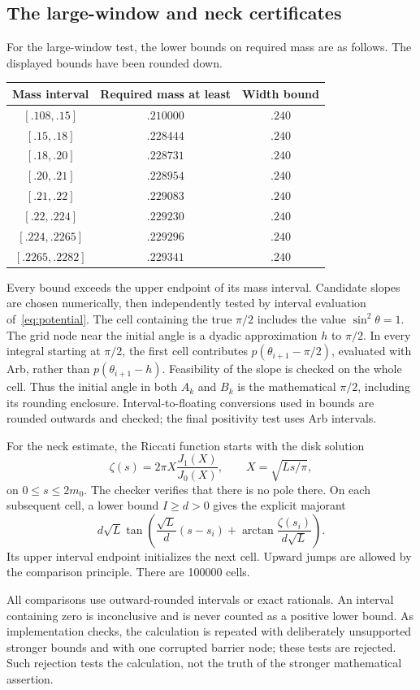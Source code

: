\subsection{The large-window and neck certificates}
For the large-window test, the lower bounds on required mass are as follows. The displayed bounds have been rounded down.
\begin{center}
\begin{tabular}{ccc}\toprule
Mass interval & Required mass at least & Width bound\\\midrule
$[.108,.15]$ & $.210000$ & $.240$\\
$[.15,.18]$ & $.228444$ & $.240$\\
$[.18,.20]$ & $.228731$ & $.240$\\
$[.20,.21]$ & $.228954$ & $.240$\\
$[.21,.22]$ & $.229083$ & $.240$\\
$[.22,.224]$ & $.229230$ & $.240$\\
$[.224,.2265]$ & $.229296$ & $.240$\\
$[.2265,.2282]$ & $.229341$ & $.240$\\\bottomrule
\end{tabular}
\end{center}
Every bound exceeds the upper endpoint of its mass interval. Candidate slopes are chosen numerically, then independently tested by interval evaluation of~\eqref{eq:potential}. The cell containing the true $\pi/2$ includes the value $\sin^2\theta=1$. The grid node near the initial angle is a dyadic approximation $h$ to $\pi/2$. In every integral starting at $\pi/2$, the first cell contributes $p(\theta_{i+1}-\pi/2)$, evaluated with Arb, rather than $p(\theta_{i+1}-h)$. Feasibility of the slope is checked on the whole cell. Thus the initial angle in both $A_k$ and $B_k$ is the mathematical $\pi/2$, including its rounding enclosure. Interval-to-floating conversions used in bounds are rounded outwards and checked; the final positivity test uses Arb intervals.

For the neck estimate, the Riccati function starts with the disk solution
\[
 \zeta(s)=2\pi X\frac{J_1(X)}{J_0(X)},\qquad X=\sqrt{Ls/\pi},
\]
on $0\le s\le2m_0$. The checker verifies that there is no pole there. On each subsequent cell, a lower bound $I\ge d>0$ gives the explicit majorant
\[
 d\sqrt L\tan\left(\frac{\sqrt L}{d}(s-s_i)
                +\arctan\frac{\zeta(s_i)}{d\sqrt L}\right).
\]
Its upper interval endpoint initializes the next cell. Upward jumps are allowed by the comparison principle. There are 100000 cells.

All comparisons use outward-rounded intervals or exact rationals. An interval containing zero is inconclusive and is never counted as a positive lower bound. As implementation checks, the calculation is repeated with deliberately unsupported stronger bounds and with one corrupted barrier node; these tests are rejected. Such rejection tests the calculation, not the truth of the stronger mathematical assertion.
